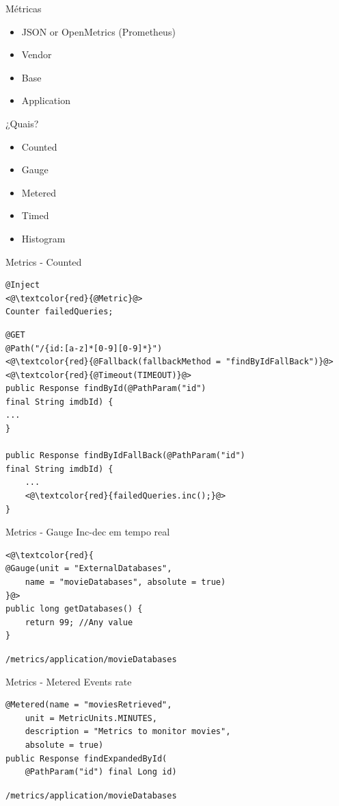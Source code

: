 \documentclass{beamer}
\begin{document}
\begin{frame}{Métricas}

\begin{itemize}
	\item JSON or OpenMetrics (Prometheus)
	\item Vendor
	\item Base
	\item Application
\end{itemize}

¿Quais? 
\begin{itemize}
	\item Counted
	\item Gauge
	\item Metered
	\item Timed
	\item Histogram
\end{itemize}

\end{frame}

\begin{frame}[fragile]{Metrics - Counted}
\begin{lstlisting}
@Inject
<@\textcolor{red}{@Metric}@>
Counter failedQueries;
\end{lstlisting}

\begin{lstlisting}
@GET
@Path("/{id:[a-z]*[0-9][0-9]*}")
<@\textcolor{red}{@Fallback(fallbackMethod = "findByIdFallBack")}@>
<@\textcolor{red}{@Timeout(TIMEOUT)}@>
public Response findById(@PathParam("id") 
final String imdbId) {
...
}

public Response findByIdFallBack(@PathParam("id") 
final String imdbId) {
	...
	<@\textcolor{red}{failedQueries.inc();}@>
}
\end{lstlisting}
\end{frame}

\begin{frame}[fragile]{Metrics - Gauge}
Inc-dec em tempo real 
\begin{lstlisting}
<@\textcolor{red}{
@Gauge(unit = "ExternalDatabases",
	name = "movieDatabases", absolute = true)
}@>
public long getDatabases() {
	return 99; //Any value
}
\end{lstlisting}

\lstinline|/metrics/application/movieDatabases|
\end{frame}

\begin{frame}[fragile]{Metrics - Metered}
Events rate
\begin{lstlisting}
@Metered(name = "moviesRetrieved",
	unit = MetricUnits.MINUTES,
	description = "Metrics to monitor movies",
	absolute = true)
public Response findExpandedById(
	@PathParam("id") final Long id) 
\end{lstlisting}

\lstinline|/metrics/application/movieDatabases|
\end{frame}
\end{document}
